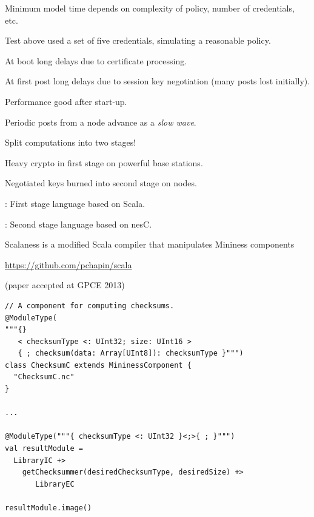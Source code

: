 Minimum model time depends on complexity of policy, number of credentials, etc.

Test above used a set of five credentials, simulating a reasonable policy.
\stopslide

\begin{citemize}
\item At boot long delays due to certificate processing.
\item At first post long delays due to session key negotiation (many posts lost initially).
\item Performance good after start-up.
\item Periodic posts from a node advance as a \textit{slow wave}.
\end{citemize}
\stopslide



\begin{citemize}
\item Split computations into two stages!
\item Heavy crypto in first stage on powerful base stations.
\item Negotiated keys burned into second stage on nodes.
\item {}: First stage language based on Scala.
\item {}: Second stage language based on nesC.
\end{citemize}

Scalaness is a modified Scala compiler that manipulates Mininess components

\begin{center}
\url{https://github.com/pchapin/scala}
\end{center}

(paper accepted at GPCE 2013)
\stopslide

\begin{lstlisting}[language=scalaness]
// A component for computing checksums.
@ModuleType(
"""{}
   < checksumType <: UInt32; size: UInt16 >
   { ; checksum(data: Array[UInt8]): checksumType }""")
class ChecksumC extends MininessComponent {
  "ChecksumC.nc"
}

...

@ModuleType("""{ checksumType <: UInt32 }<;>{ ; }""")
val resultModule =
  LibraryIC +>
    getChecksummer(desiredChecksumType, desiredSize) +>
       LibraryEC

resultModule.image()
\end{lstlisting}
\stopslide


